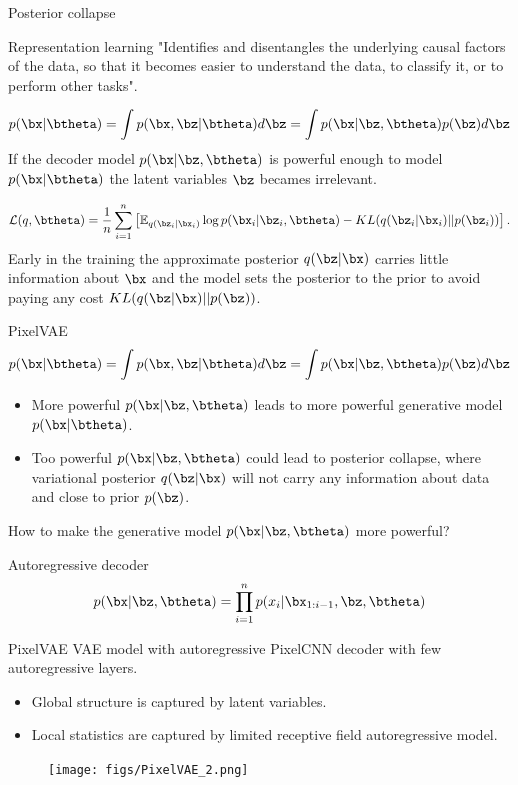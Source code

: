 \begin{frame}{Posterior collapse}
	\begin{block}{Representation learning}
		"Identifies and disentangles the underlying causal factors of the data, so that it becomes easier to understand the data, to classify it, or to perform other tasks".
	\end{block}
	\[
		p(\bx | \btheta) = \int p(\bx, \bz | \btheta) d \bz = \int p(\bx | \bz, \btheta) p(\bz) d \bz 
	\]
	If the decoder model $p(\bx | \bz, \btheta)$ is powerful enough to model $p(\bx | \btheta)$ the latent variables $\bz$ becames irrelevant.
	
	\[
		\mathcal{L}(q, \btheta) = \frac{1}{n} \sum_{i=1}^n \left[ \mathbb{E}_{q(\bz_i | \bx_i)} \log p(\bx_i | \bz_i, \btheta) - KL(q(\bz_i | \bx_i) || p(\bz_i)) \right].
	\]
	Early in the training the approximate posterior $q(\bz|\bx)$ carries little information about $\bx$ and the model sets the posterior to the prior to avoid paying any cost $KL(q(\bz|\bx)||p(\bz))$.
\end{frame}
\begin{frame}{PixelVAE}
	\[
	    p(\bx | \btheta) = \int p(\bx, \bz | \btheta) d \bz = \int p(\bx | \bz, \btheta) p(\bz) d \bz 
	\]
	\begin{itemize}
		\item More powerful $p(\bx | \bz, \btheta)$ leads to more powerful generative model $p(\bx | \btheta)$.
		\item Too powerful $p(\bx | \bz, \btheta)$ could lead to posterior collapse, where variational posterior $q(\bz | \bx)$ will not carry any information about data and close to prior $p(\bz)$.
	\end{itemize}
	How to make the generative model $p(\bx | \bz, \btheta)$ more powerful?
	\begin{block}{Autoregressive decoder}
	\[
	    p(\bx | \bz , \btheta) = \prod_{i=1}^n p(x_i | \bx_{1:i - 1}, \bz , \btheta)
	\]
	\end{block}
	
\end{frame}
\begin{frame}{PixelVAE}
	VAE model with autoregressive PixelCNN decoder with few autoregressive layers. 
	\begin{itemize}
		\item Global structure is captured by latent variables.
		\item Local statistics are captured by limited receptive field autoregressive model.
	\end{itemize}
	\begin{figure}
	    \centering
	    \texttt{[image: figs/PixelVAE\_2.png]}
	\end{figure}
		
\end{frame}

